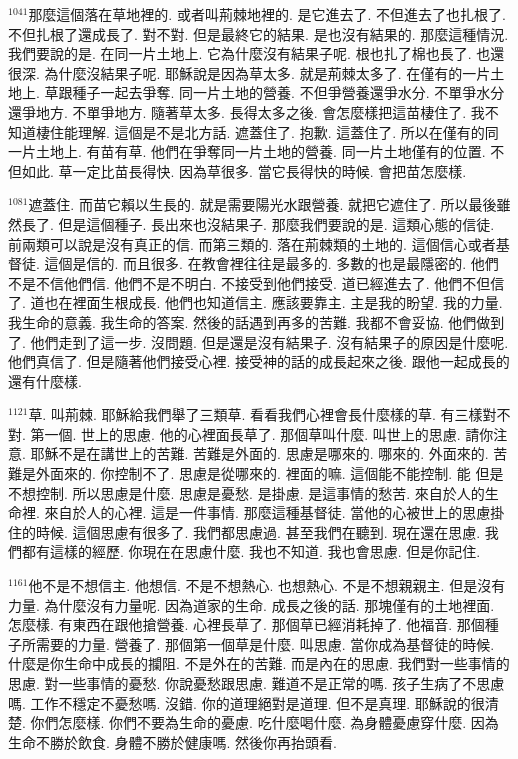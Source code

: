 \documentclass{book}
\begin{document}
$^{1041}$那麼這個落在草地裡的.
或者叫荊棘地裡的.
是它進去了.
不但進去了也扎根了.
不但扎根了還成長了.
對不對.
但是最終它的結果.
是也沒有結果的.
那麼這種情況.
我們要說的是.
在同一片土地上.
它為什麼沒有結果子呢.
根也扎了棉也長了.
也還很深.
為什麼沒結果子呢.
耶穌說是因為草太多.
就是荊棘太多了.
在僅有的一片土地上.
草跟種子一起去爭奪.
同一片土地的營養.
不但爭營養還爭水分.
不單爭水分還爭地方.
不單爭地方.
隨著草太多.
長得太多之後.
會怎麼樣把這苗棲住了.
我不知道棲住能理解.
這個是不是北方話.
遮蓋住了.
抱歉.
這蓋住了.
所以在僅有的同一片土地上.
有苗有草.
他們在爭奪同一片土地的營養.
同一片土地僅有的位置.
不但如此.
草一定比苗長得快.
因為草很多.
當它長得快的時候.
會把苗怎麼樣.

$^{1081}$遮蓋住.
而苗它賴以生長的.
就是需要陽光水跟營養.
就把它遮住了.
所以最後雖然長了.
但是這個種子.
長出來也沒結果子.
那麼我們要說的是.
這類心態的信徒.
前兩類可以說是沒有真正的信.
而第三類的.
落在荊棘類的土地的.
這個信心或者基督徒.
這個是信的.
而且很多.
在教會裡往往是最多的.
多數的也是最隱密的.
他們不是不信他們信.
他們不是不明白.
不接受到他們接受.
道已經進去了.
他們不但信了.
道也在裡面生根成長.
他們也知道信主.
應該要靠主.
主是我的盼望.
我的力量.
我生命的意義.
我生命的答案.
然後的話遇到再多的苦難.
我都不會妥協.
他們做到了.
他們走到了這一步.
沒問題.
但是還是沒有結果子.
沒有結果子的原因是什麼呢.
他們真信了.
但是隨著他們接受心裡.
接受神的話的成長起來之後.
跟他一起成長的還有什麼樣.

$^{1121}$草.
叫荊棘.
耶穌給我們舉了三類草.
看看我們心裡會長什麼樣的草.
有三樣對不對.
第一個.
世上的思慮.
他的心裡面長草了.
那個草叫什麼.
叫世上的思慮.
請你注意.
耶穌不是在講世上的苦難.
苦難是外面的.
思慮是哪來的.
哪來的.
外面來的.
苦難是外面來的.
你控制不了.
思慮是從哪來的.
裡面的嘛.
這個能不能控制.
能 但是不想控制.
所以思慮是什麼.
思慮是憂愁.
是掛慮.
是這事情的愁苦.
來自於人的生命裡.
來自於人的心裡.
這是一件事情.
那麼這種基督徒.
當他的心被世上的思慮掛住的時候.
這個思慮有很多了.
我們都思慮過.
甚至我們在聽到.
現在還在思慮.
我們都有這樣的經歷.
你現在在思慮什麼.
我也不知道.
我也會思慮.
但是你記住.

$^{1161}$他不是不想信主.
他想信.
不是不想熱心.
也想熱心.
不是不想親親主.
但是沒有力量.
為什麼沒有力量呢.
因為道家的生命.
成長之後的話.
那塊僅有的土地裡面.
怎麼樣.
有東西在跟他搶營養.
心裡長草了.
那個草已經消耗掉了.
他福音.
那個種子所需要的力量.
營養了.
那個第一個草是什麼.
叫思慮.
當你成為基督徒的時候.
什麼是你生命中成長的攔阻.
不是外在的苦難.
而是內在的思慮.
我們對一些事情的思慮.
對一些事情的憂愁.
你說憂愁跟思慮.
難道不是正常的嗎.
孩子生病了不思慮嗎.
工作不穩定不憂愁嗎.
沒錯.
你的道理絕對是道理.
但不是真理.
耶穌說的很清楚.
你們怎麼樣.
你們不要為生命的憂慮.
吃什麼喝什麼.
為身體憂慮穿什麼.
因為生命不勝於飲食.
身體不勝於健康嗎.
然後你再抬頭看.
\end{document}
